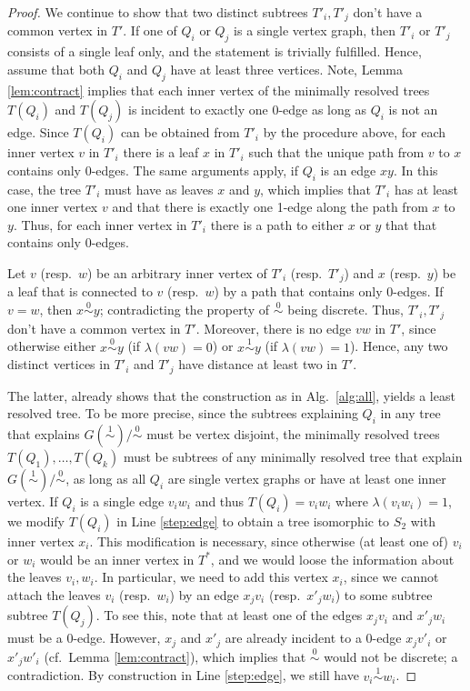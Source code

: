 \documentclass[smallextended]{svjour3}
\newcommand{\Ro}{\mathrel{\overset{0}{\sim}}}
\newcommand{\Rl}{\mathrel{\overset{1}{\sim}}}
\begin{document}
\begin{proof}
{	We continue to show that two distinct subtrees $T'_i, T'_j$ don't
   have a common vertex in $T'$.  
	If one of $Q_i$ or $Q_j$ is a single vertex graph, then 
	$T'_i$ or $T'_j$ consists of a single leaf only, and the 
	statement is trivially fulfilled. 
	Hence, assume that both $Q_i$ and $Q_j$ have at least three vertices. 
	Note, Lemma \ref{lem:contract} implies that each inner vertex
   of the minimally resolved trees $T(Q_i)$ and $T(Q_j)$ is
   incident to exactly one 0-edge as long as $Q_i$ is not an edge.
	Since  $T(Q_i)$ can be obtained from  $T'_i$  by the procedure
   above, for each inner vertex $v$ in $T'_i$ there is a leaf $x$
	in $T'_i$ such that the unique path from $v$ to $x$ contains only 
	0-edges. 
	The same arguments apply, if $Q_i$ is an edge $xy$. In this case, 
   the tree $T'_i$ must have 
	as leaves $x$ and $y$, which implies that $T'_i$ has at least 
   one inner vertex $v$ and that there is exactly one 1-edge along the path from 
	$x$ to $y$. Thus, for each inner vertex in $T'_i$ there is a path
	to either $x$ or $y$ that that contains only 0-edges.

	Let $v$ (resp.\ $w$) be an arbitrary inner vertex of $T'_i$ (resp.\ $T'_j$)
	and $x$ (resp.\ $y$) be a leaf that is connected to $v$ (resp.\ $w$) 
   by a path that contains only 0-edges.
	If $v=w$, then $x\Ro y$; contradicting the property of $\Ro$ being discrete. 
	Thus, $T'_i, T'_j$ don't  have a common vertex in $T'$.  
	Moreover, there is no edge $vw$ in $T'$, since otherwise either
   $x\Ro y$ (if $\lambda(vw)=0$) or $x\Rl y$ (if $\lambda(vw)=1$). 
	Hence, any two distinct vertices in $T'_i$ and $T'_j$ have distance
	at least two in $T'$. 

	The latter, already shows that the construction as 
	in  Alg.\  \ref{alg:all}, yields a least resolved tree. 
   To be more
	precise, since the subtrees explaining $Q_i$ in any tree that explains 
	$G(\Rl)/\Ro$ must be vertex disjoint, the minimally resolved trees 
   $T(Q_1),\dots,T(Q_k)$ must be subtrees of any 
   minimally resolved tree that explain $G(\Rl)/\Ro$, as long as 
	all $Q_i$ are single vertex graphs or have at least one inner vertex. 
	If $Q_i$ is a single edge $v_iw_i$ and thus $T(Q_i) = v_iw_i$
	where $\lambda(v_iw_i)=1$, we modify $T(Q_i)$ 
	in  Line \ref{step:edge} to obtain a tree isomorphic to $S_2$ with inner
   vertex $x_i$. This modification is necessary, since otherwise (at least one of)
	$v_i$ or $w_i$ would be an inner vertex in $T^*$, and we would loose 
	the information about the leaves $v_i,w_i$. In particular, we need to add
	this vertex $x_i$, since we cannot attach the leaves $v_i$ (resp.\ $w_i$)
	by an edge $x_jv_i$ (resp.\ $x'_jw_i$) to some subtree 
	subtree $T(Q_j)$.  To see this, note that at least one of the edges 
	 $x_jv_i$ and  $x'_jw_i$ must be a 0-edge. However, 
	$x_j$ and $x'_j$ are already incident to a 0-edge  $x_jv'_i$ or  $x'_jw'_i$   (cf.\  Lemma \ref{lem:contract}), 
	which implies that $\Ro$ would not be discrete; a contradiction. 
	By construction in 
	Line \ref{step:edge}, we still have $v_i\Rl w_i$. 
	
}
\end{proof}
\end{document}
